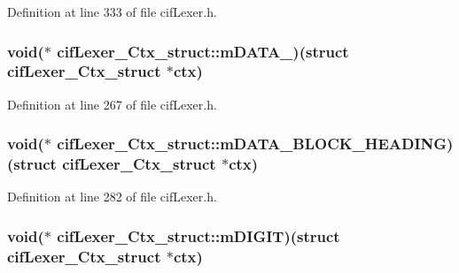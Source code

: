Definition at line 333 of file cif\-Lexer.\-h.

\hypertarget{structcif_lexer___ctx__struct_aa827a676c2985b284b8d86be6aa04738}{
\subsubsection[{m\-D\-A\-T\-A\-\_\-}]{\setlength{\rightskip}{0pt plus 5cm}void($\ast$ cif\-Lexer\-\_\-\-Ctx\-\_\-struct\-::m\-D\-A\-T\-A\-\_\-)(struct {\bf cif\-Lexer\-\_\-\-Ctx\-\_\-struct} $\ast$ctx)}}\label{structcif_lexer___ctx__struct_aa827a676c2985b284b8d86be6aa04738}


Definition at line 267 of file cif\-Lexer.\-h.

\hypertarget{structcif_lexer___ctx__struct_ae1d52c8de1f105728bb30e76a443a273}{
\subsubsection[{m\-D\-A\-T\-A\-\_\-\-B\-L\-O\-C\-K\-\_\-\-H\-E\-A\-D\-I\-N\-G}]{\setlength{\rightskip}{0pt plus 5cm}void($\ast$ cif\-Lexer\-\_\-\-Ctx\-\_\-struct\-::m\-D\-A\-T\-A\-\_\-\-B\-L\-O\-C\-K\-\_\-\-H\-E\-A\-D\-I\-N\-G)(struct {\bf cif\-Lexer\-\_\-\-Ctx\-\_\-struct} $\ast$ctx)}}\label{structcif_lexer___ctx__struct_ae1d52c8de1f105728bb30e76a443a273}


Definition at line 282 of file cif\-Lexer.\-h.

\hypertarget{structcif_lexer___ctx__struct_a3ccc3fa0f6d4a69a40142220bd875a30}{
\subsubsection[{m\-D\-I\-G\-I\-T}]{\setlength{\rightskip}{0pt plus 5cm}void($\ast$ cif\-Lexer\-\_\-\-Ctx\-\_\-struct\-::m\-D\-I\-G\-I\-T)(struct {\bf cif\-Lexer\-\_\-\-Ctx\-\_\-struct} $\ast$ctx)}}\label{structcif_lexer___ctx__struct_a3ccc3fa0f6d4a69a40142220bd875a30}


